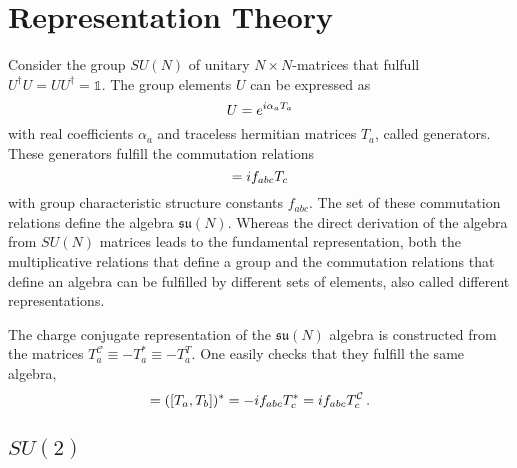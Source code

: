 \section{Representation Theory}

Consider the group $SU(N)$ of unitary ${N\times N}$-matrices that fulfull ${U^\dagger U=UU^\dagger=\mathbb{1}}$. The group elements $U$ can be expressed as
\begin{equation}
    U=e^{{i} \alpha_aT_a}
\end{equation}
with real coefficients $\alpha_a$ and traceless hermitian matrices $T_a$, called generators. These generators fulfill the commutation relations
\begin{equation}
    [T_a,T_b]=\imagu f_{abc}T_c
\end{equation}
with group characteristic structure constants $f_{abc}$. The set of these commutation relations define the algebra $\mathfrak{su}(N)$. Whereas the direct derivation of the algebra from $SU(N)$ matrices leads to the fundamental representation, both the multiplicative relations that define a group and the commutation relations that define an algebra can be fulfilled by different sets of elements, also called different representations. 

The charge conjugate representation of the $\mathfrak{su}(N)$ algebra is constructed from the matrices ${T_a^\mathcal{C}\equiv -T_a^*\equiv -T_a^T}$. One easily checks that they fulfill the same algebra,
\begin{equation}
    [T_a^\mathcal{C},T_b^\mathcal{C}]=([T_a,T_b])^*=-\imagu f_{abc}T_c^*=\imagu f_{abc}T_c^\mathcal{C}\,.
\end{equation}

\subsection{$SU(2)$}

